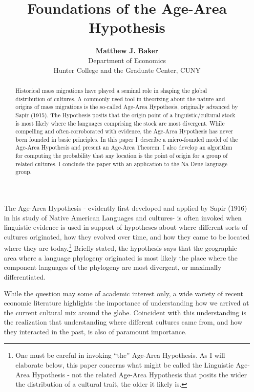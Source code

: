 \documentclass[11pt]{article}
\title{Foundations of the Age-Area Hypothesis}
\author{\textbf{Matthew J. Baker} \\ Department of Economics \\ Hunter College and the Graduate Center, CUNY}
\begin{document}
\maketitle
\begin{abstract}
\noindent Historical mass migrations have played a seminal role in shaping the global distribution of cultures. A commonly used tool in theorizing about the nature and origins of mass migrations is the so-called Age-Area Hypothesis, originally advanced by Sapir (1915). The Hypothesis posits that the origin point of a linguistic/cultural stock is most likely where the languages comprising the stock are most divergent. While compelling and often-corroborated with evidence, the Age-Area Hypothesis has never been founded in basic principles. In this paper I\ describe a micro-founded model of the Age-Area Hypothesis and present an Age-Area Theorem. I also develop an algorithm for computing the probability that any location is the point of origin for a group of related cultures. I conclude the paper with an application to the Na Dene language group. 
\end{abstract}
\newpage

The Age-Area Hypothesis - evidently first developed and applied by Sapir (1916) in his study of Native American Languages and cultures- is often invoked when linguistic
evidence is used in support of hypotheses about where different sorts of cultures originated, how they evolved over time, and how they came to be located where they are today.\footnote{One must be careful in invoking ``the'' Age-Area Hypothesis. As I will elaborate below, this paper concerns what might be called the Linguistic Age-Area Hypothesis - not the related Age-Area Hypothesis that posits the wider the distribution of a cultural trait, the older it likely is.} Briefly stated, the hypothesis says that the geographic area where a language phylogeny originated is most likely the place where the component languages of the phylogeny are most divergent, or maximally differentiated.



While the question may some of academic interest only, a wide variety of recent economic literature highlights the importance of understanding how we arrived at the current cultural mix around the globe. Coincident with this understanding is the realization that understanding where different cultures came from, and how they interacted in the past, is also of paramount importance.
\end{document}
